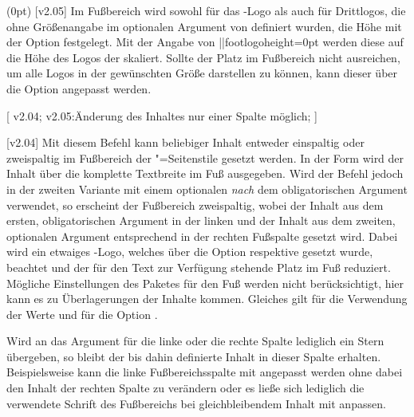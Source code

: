 \begin{DeclareEntity*}{}
\begin{DeclareEntity*}{}
\begin{DeclareEntity*}{}
\begin{Declaration}
  {}
  (0pt)
  [v2.05]
\printdeclarationlist
%
Im Fußbereich wird sowohl für das \DDC-Logo als auch für Drittlogos, die ohne 
Größenangabe im optionalen Argument von  definiert wurden, die 
Höhe mit der Option  festgelegt. Mit der Angabe 
von \Option||{footlogoheight=0pt} werden diese auf die Höhe des Logos der 
\TnUD skaliert. Sollte der Platz im Fußbereich nicht ausreichen, um alle Logos 
in der gewünschten Größe darstellen zu können, kann dieser über die Option
 angepasst werden.
\end{Declaration}

\begin{Declaration}
  {}
  [
    v2.04;
    v2.05:Änderung des Inhaltes nur einer Spalte möglich;
  ]
\begin{Declaration}
  {}
  [v2.04]
Mit diesem Befehl kann beliebiger Inhalt entweder einspaltig oder zweispaltig 
im Fußbereich der "=Seitenstile gesetzt werden. In der 
Form  wird der Inhalt über die komplette 
Textbreite im Fuß ausgegeben. Wird der Befehl jedoch in der zweiten Variante 
 mit einem 
optionalen \emph{nach} dem obligatorischen Argument verwendet, so erscheint der 
Fußbereich zweispaltig, wobei der Inhalt aus dem ersten, obligatorischen 
Argument in der linken und der Inhalt aus dem zweiten, optionalen Argument 
entsprechend in der rechten Fußspalte gesetzt wird. Dabei wird ein etwaiges 
\DDC-Logo, welches über die Option  respektive  
gesetzt wurde, beachtet und der für den Text zur Verfügung stehende Platz im 
Fuß reduziert. Mögliche Einstellungen des Paketes  
für den Fuß werden nicht berücksichtigt, hier kann es zu Überlagerungen der 
Inhalte kommen. Gleiches gilt für die Verwendung der Werte  und 
 für die Option .

%
Wird an das Argument für die linke oder die rechte Spalte lediglich ein Stern 
\PValue{*} übergeben, so bleibt der bis dahin definierte Inhalt in dieser 
Spalte erhalten. Beispielsweise kann die linke Fußbereichsspalte mit 
 angepasst werden ohne dabei den 
Inhalt der rechten Spalte zu verändern oder es ließe sich lediglich die 
verwendete Schrift des Fußbereichs bei gleichbleibendem Inhalt mit 
 anpassen.


\end{Declaration}
\end{Declaration}
\end{DeclareEntity*}
\end{DeclareEntity*}
\end{DeclareEntity*}
